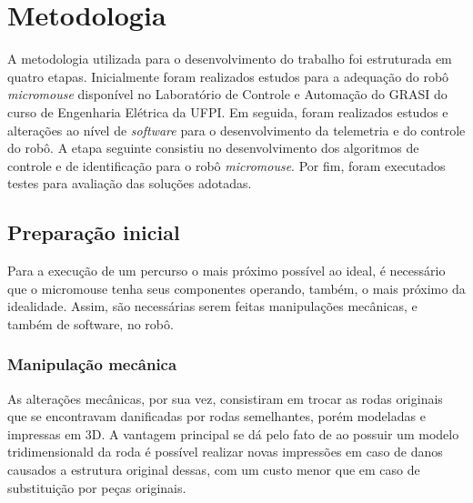\chapter{Metodologia}
\label{cap:metodologia}


A metodologia utilizada para o desenvolvimento do trabalho foi estruturada em quatro etapas. Inicialmente foram realizados estudos para a adequação do robô \textit{micromouse} disponível no Laboratório de Controle e Automação do \gls{GRASI} do curso de Engenharia Elétrica da \gls{UFPI}. Em seguida, foram realizados estudos e alterações ao nível de \textit{software} para o desenvolvimento da telemetria e do controle do robô. A etapa seguinte consistiu no desenvolvimento dos algoritmos de controle e de identificação para o robô \textit{micromouse}. Por fim, foram executados testes para avaliação das soluções adotadas.

    \section{Preparação inicial} \label{sec:preparacao}
    
        Para a execução de um percurso o mais próximo possível ao ideal, é necessário que o micromouse tenha seus componentes operando, também, o mais próximo da idealidade. Assim, são necessárias serem feitas manipulações mecânicas, e também de software, no robô. 
        
        \subsection{Manipulação mecânica} \label{ssec:manipulacao-mecanica}
            As alterações mecânicas, por sua vez, consistiram em trocar as rodas originais que se encontravam danificadas por rodas semelhantes, porém modeladas e impressas em 3D. A vantagem principal se dá pelo fato de ao possuir um modelo tridimensionald da roda é possível realizar novas impressões em caso de danos causados a estrutura original dessas, com um custo menor que em caso de substituição por peças originais. 
            
